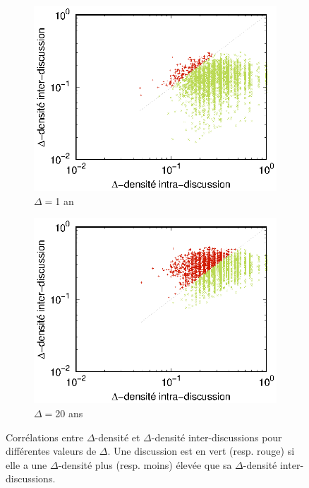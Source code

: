 \begin{figure}[h]
	\begin{subfigure}{0.4\textwidth}
		\includegraphics[width=\linewidth]{img/mailing/DensityCurve/63072000/mean.eps}
		\caption{$\Delta= $1 an}		
	\end{subfigure}
	\begin{subfigure}{0.4\textwidth}
		\includegraphics[width=\linewidth]{img/mailing/DensityCurve/1261440000/mean.eps}
		\caption{$\Delta= $20 ans}	
		\label{fig:corel_inter_discussion_20}	
	\end{subfigure}

\caption{Corrélations entre $\Delta$-densité et $\Delta$-densité inter-discussions pour différentes valeurs de $\Delta$. Une discussion est en vert (resp. rouge) si elle a une $\Delta$-densité plus (resp. moins) élevée que sa $\Delta$-densité inter-discussions.}
\label{fig:corel_inter_discussion}
\end{figure}



